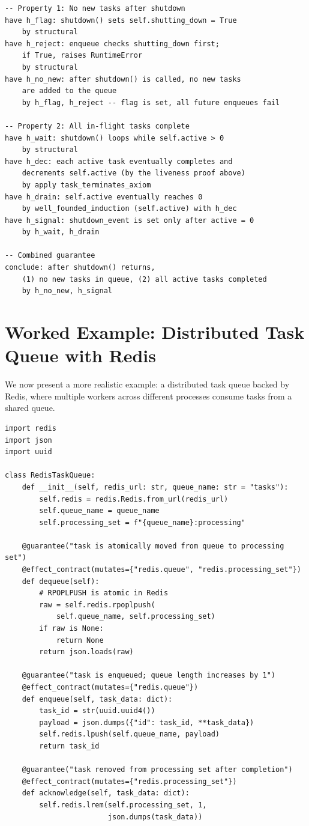 \documentclass[11pt,a4paper]{report}
\theoremstyle{definition}
\theoremstyle{plain}
\begin{document}
\begin{lstlisting}[style=proof]
-- Property 1: No new tasks after shutdown
have h_flag: shutdown() sets self.shutting_down = True
    by structural
have h_reject: enqueue checks shutting_down first;
    if True, raises RuntimeError
    by structural
have h_no_new: after shutdown() is called, no new tasks
    are added to the queue
    by h_flag, h_reject -- flag is set, all future enqueues fail

-- Property 2: All in-flight tasks complete
have h_wait: shutdown() loops while self.active > 0
    by structural
have h_dec: each active task eventually completes and
    decrements self.active (by the liveness proof above)
    by apply task_terminates_axiom
have h_drain: self.active eventually reaches 0
    by well_founded_induction (self.active) with h_dec
have h_signal: shutdown_event is set only after active = 0
    by h_wait, h_drain

-- Combined guarantee
conclude: after shutdown() returns,
    (1) no new tasks in queue, (2) all active tasks completed
    by h_no_new, h_signal
\end{lstlisting}

\section{Worked Example: Distributed Task Queue with Redis}

We now present a more realistic example: a distributed task queue backed
by Redis, where multiple workers across different processes consume tasks
from a shared queue.

\begin{lstlisting}[style=synhopy]
import redis
import json
import uuid

class RedisTaskQueue:
    def __init__(self, redis_url: str, queue_name: str = "tasks"):
        self.redis = redis.Redis.from_url(redis_url)
        self.queue_name = queue_name
        self.processing_set = f"{queue_name}:processing"

    @guarantee("task is atomically moved from queue to processing set")
    @effect_contract(mutates={"redis.queue", "redis.processing_set"})
    def dequeue(self):
        # RPOPLPUSH is atomic in Redis
        raw = self.redis.rpoplpush(
            self.queue_name, self.processing_set)
        if raw is None:
            return None
        return json.loads(raw)

    @guarantee("task is enqueued; queue length increases by 1")
    @effect_contract(mutates={"redis.queue"})
    def enqueue(self, task_data: dict):
        task_id = str(uuid.uuid4())
        payload = json.dumps({"id": task_id, **task_data})
        self.redis.lpush(self.queue_name, payload)
        return task_id

    @guarantee("task removed from processing set after completion")
    @effect_contract(mutates={"redis.processing_set"})
    def acknowledge(self, task_data: dict):
        self.redis.lrem(self.processing_set, 1,
                        json.dumps(task_data))
\end{lstlisting}
\end{document}
